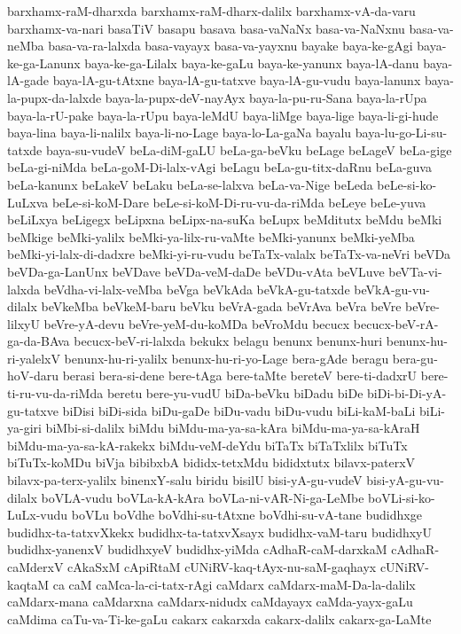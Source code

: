 {barxhamx-raM-dharxda
barxhamx-raM-dharx-dalilx
barxhamx-vA-da-varu
barxhamx-va-nari
basaTiV
basapu
basava
basa-vaNaNx
basa-va-NaNxnu
basa-va-neMba
basa-va-ra-lalxda
basa-vayayx
basa-va-yayxnu
bayake
baya-ke-gAgi
baya-ke-ga-Lanunx
baya-ke-ga-Lilalx
baya-ke-gaLu
baya-ke-yanunx
baya-lA-danu
baya-lA-gade
baya-lA-gu-tAtxne
baya-lA-gu-tatxve
baya-lA-gu-vudu
baya-lanunx
baya-la-pupx-da-lalxde
baya-la-pupx-deV-nayAyx
baya-la-pu-ru-Sana
baya-la-rUpa
baya-la-rU-pake
baya-la-rUpu
baya-leMdU
baya-liMge
baya-lige
baya-li-gi-hude
baya-lina
baya-li-nalilx
baya-li-no-Lage
baya-lo-La-gaNa
bayalu
baya-lu-go-Li-su-tatxde
baya-su-vudeV
beLa-diM-gaLU
beLa-ga-beVku
beLage
beLageV
beLa-gige
beLa-gi-niMda
beLa-goM-Di-lalx-vAgi
beLagu
beLa-gu-titx-daRnu
beLa-guva
beLa-kanunx
beLakeV
beLaku
beLa-se-lalxva
beLa-va-Nige
beLeda
beLe-si-ko-LuLxva
beLe-si-koM-Dare
beLe-si-koM-Di-ru-vu-da-riMda
beLeye
beLe-yuva
beLiLxya
beLigegx
beLipxna
beLipx-na-suKa
beLupx
beMditutx
beMdu
beMki
beMkige
beMki-yalilx
beMki-ya-lilx-ru-vaMte
beMki-yanunx
beMki-yeMba
beMki-yi-lalx-di-dadxre
beMki-yi-ru-vudu
beTaTx-valalx
beTaTx-va-neVri
beVDa
beVDa-ga-LanUnx
beVDave
beVDa-veM-daDe
beVDu-vAta
beVLuve
beVTa-vi-lalxda
beVdha-vi-lalx-veMba
beVga
beVkAda
beVkA-gu-tatxde
beVkA-gu-vu-dilalx
beVkeMba
beVkeM-baru
beVku
beVrA-gada
beVrAva
beVra
beVre
beVre-lilxyU
beVre-yA-devu
beVre-yeM-du-koMDa
beVroMdu
becucx
becucx-beV-rA-ga-da-BAva
becucx-beV-ri-lalxda
bekukx
belagu
benunx
benunx-huri
benunx-hu-ri-yalelxV
benunx-hu-ri-yalilx
benunx-hu-ri-yo-Lage
bera-gAde
beragu
bera-gu-hoV-daru
berasi
bera-si-dene
bere-tAga
bere-taMte
bereteV
bere-ti-dadxrU
bere-ti-ru-vu-da-riMda
beretu
bere-yu-vudU
biDa-beVku
biDadu
biDe
biDi-bi-Di-yA-gu-tatxve
biDisi
biDi-sida
biDu-gaDe
biDu-vadu
biDu-vudu
biLi-kaM-baLi
biLi-ya-giri
biMbi-si-dalilx
biMdu
biMdu-ma-ya-sa-kAra
biMdu-ma-ya-sa-kAraH
biMdu-ma-ya-sa-kA-rakekx
biMdu-veM-deYdu
biTaTx
biTaTxlilx
biTuTx
biTuTx-koMDu
biVja
bibibxbA
bididx-tetxMdu
bididxtutx
bilavx-paterxV
bilavx-pa-terx-yalilx
binenxY-salu
biridu
bisilU
bisi-yA-gu-vudeV
bisi-yA-gu-vu-dilalx
boVLA-vudu
boVLa-kA-kAra
boVLa-ni-vAR-Ni-ga-LeMbe
boVLi-si-ko-LuLx-vudu
boVLu
boVdhe
boVdhi-su-tAtxne
boVdhi-su-vA-tane
budidhxge
budidhx-ta-tatxvXkekx
budidhx-ta-tatxvXsayx
budidhx-vaM-taru
budidhxyU
budidhx-yanenxV
budidhxyeV
budidhx-yiMda
cAdhaR-caM-darxkaM
cAdhaR-caMderxV
cAkaSxM
cApiRtaM
cUNiRV-kaq-tAyx-nu-saM-gaqhayx
cUNiRV-kaqtaM
ca
caM
caMca-la-ci-tatx-rAgi
caMdarx
caMdarx-maM-Da-la-dalilx
caMdarx-mana
caMdarxna
caMdarx-nidudx
caMdayayx
caMda-yayx-gaLu
caMdima
caTu-va-Ti-ke-gaLu
cakarx
cakarxda
cakarx-dalilx
cakarx-ga-LaMte
}
